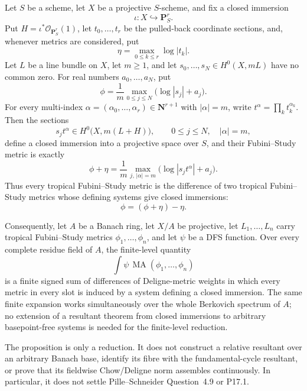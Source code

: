 
\begin{proposition}
\label{prop:p171-closed-immersion-finite-level-reduction}
Let \(S\) be a scheme, let \(X\) be a projective \(S\)-scheme, and fix a
closed immersion
\[
 \iota:X\hookrightarrow\mathbf P^r_S.
\]
Put \(H=\iota^*\mathcal O_{\mathbf P^r_S}(1)\), let
\(t_0,\ldots,t_r\) be the pulled-back coordinate sections, and, whenever
metrics are considered, put
\[
                         \eta=\max_{0\leq k\leq r}\log|t_k|.
\]
Let \(L\) be a line bundle on \(X\), let \(m\geq1\), and let
\(s_0,\ldots,s_N\in H^0(X,mL)\) have no common zero.  For real numbers
\(a_0,\ldots,a_N\), put
\[
                 \phi=\frac1m\max_{0\leq j\leq N}
                              \bigl(\log|s_j|+a_j\bigr).
\]
For every multi-index
\(\alpha=(\alpha_0,\ldots,\alpha_r)\in\mathbf N^{r+1}\) with
\(|\alpha|=m\), write \(t^\alpha=\prod_k t_k^{\alpha_k}\).  Then the
sections
\[
           s_jt^\alpha\in H^0\bigl(X,m(L+H)\bigr),
           \qquad 0\leq j\leq N,\quad |\alpha|=m,
\]
define a closed immersion into a projective space over \(S\), and their
Fubini--Study metric is exactly
\begin{equation}
\label{eq:p171-closed-immersion-metric-identity}
 \phi+\eta
 =\frac1m\max_{j,\,|\alpha|=m}
       \bigl(\log|s_jt^\alpha|+a_j\bigr).
\end{equation}
Thus every tropical Fubini--Study metric is the difference of two
tropical Fubini--Study metrics whose defining systems give closed
immersions:
\begin{equation}
\label{eq:p171-closed-immersion-difference}
                         \phi=(\phi+\eta)-\eta.
\end{equation}

Consequently, let \(A\) be a Banach ring, let \(X/A\) be projective, let
\(L_1,\ldots,L_n\) carry tropical Fubini--Study metrics
\(\phi_1,\ldots,\phi_n\), and let \(\psi\) be a DFS function.  Over every
complete residue field of \(A\), the finite-level quantity
\[
                       \int\psi\,
                       \operatorname{MA}(\phi_1,\ldots,\phi_n)
\]
is a finite signed sum of differences of Deligne-metric weights in which
every metric in every slot is induced by a system defining a closed
immersion.  The same finite expansion works simultaneously over the whole
Berkovich spectrum of \(A\); no extension of a resultant theorem from
closed immersions to arbitrary basepoint-free systems is needed for the
finite-level reduction.
\end{proposition}

\begin{remark}
\label{rem:p171-closed-immersion-reduction-scope}
The proposition is only a reduction.  It does not construct a relative
resultant over an arbitrary Banach base, identify its fibre with the
fundamental-cycle resultant, or prove that its fieldwise Chow/Deligne norm
assembles continuously.  In particular, it does not settle Pille--Schneider
Question~4.9 or P17.1.
\end{remark}
